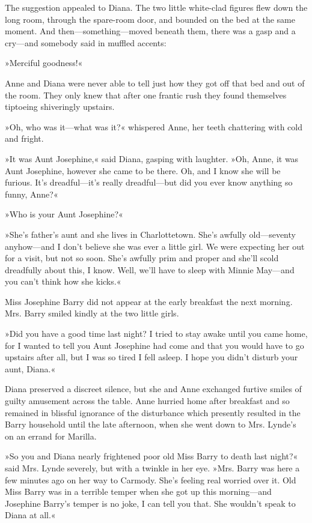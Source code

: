 The suggestion appealed to Diana. The two little white-clad figures flew down the long room, through the spare-room door, and bounded on the bed at the same moment. And then—something—moved beneath them, there was a gasp and a cry—and somebody said in muffled accents:

»Merciful goodness!«

Anne and Diana were never able to tell just how they got off that bed and out of the room. They only knew that after one frantic rush they found themselves tiptoeing shiveringly upstairs.

»Oh, who was it—what was it?« whispered Anne, her teeth chattering with cold and fright.

»It was Aunt Josephine,« said Diana, gasping with laughter. »Oh, Anne, it was Aunt Josephine, however she came to be there. Oh, and I know she will be furious. It's dreadful—it's really dreadful—but did you ever know anything so funny, Anne?«

»Who is your Aunt Josephine?«

»She's father's aunt and she lives in Charlottetown. She's awfully old—seventy anyhow—and I don't believe she was ever a little girl. We were expecting her out for a visit, but not so soon. She's awfully prim and proper and she'll scold dreadfully about this, I know. Well, we'll have to sleep with Minnie May—and you can't think how she kicks.«

Miss Josephine Barry did not appear at the early breakfast the next morning. Mrs. Barry smiled kindly at the two little girls.

»Did you have a good time last night? I tried to stay awake until you came home, for I wanted to tell you Aunt Josephine had come and that you would have to go upstairs after all, but I was so tired I fell asleep. I hope you didn't disturb your aunt, Diana.«

Diana preserved a discreet silence, but she and Anne exchanged furtive smiles of guilty amusement across the table. Anne hurried home after breakfast and so remained in blissful ignorance of the disturbance which presently resulted in the Barry household until the late afternoon, when she went down to Mrs. Lynde's on an errand for Marilla.

»So you and Diana nearly frightened poor old Miss Barry to death last night?« said Mrs. Lynde severely, but with a twinkle in her eye. »Mrs. Barry was here a few minutes ago on her way to Carmody. She's feeling real worried over it. Old Miss Barry was in a terrible temper when she got up this morning—and Josephine Barry's temper is no joke, I can tell you that. She wouldn't speak to Diana at all.«

